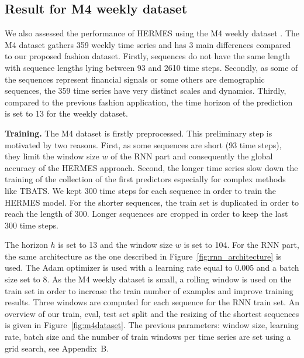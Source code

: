 \documentclass[review]{elsarticle}
\begin{document}
\subsection{Result for M4 weekly dataset}

We also assessed the performance of HERMES using the M4 weekly dataset \cite{makridakis2020m4}. The M4 dataset gathers 359 weekly time series and has 3 main differences compared to our proposed fashion dataset. Firstly, sequences do not have the same length with sequence lengths lying between 93 and 2610 time steps. Secondly, as some of the sequences represent financial signals or some others are demographic sequences, the  359 time series have very distinct scales and dynamics. Thirdly, compared to the previous fashion application, the time horizon of the prediction is set to 13 for the weekly dataset. 

\textbf{Training. } The M4 dataset is firstly preprocessed. This preliminary step is motivated by two reasons. First, as some sequences are short (93 time steps), they limit the window size $w$ of the RNN part and consequently the global accuracy of the HERMES approach. Second, the longer time series slow down the training of the collection of the first predictors especially for complex methods like TBATS. We kept 300 time steps  for each sequence in order to train the HERMES model. For the shorter sequences, the train set is duplicated in order to reach the length of 300. Longer sequences are cropped in order to keep the last 300 time steps.

The horizon $h$ is set to 13  and the window size $w$ is set to 104. For the RNN part, the same architecture as the one described in Figure~\ref{fig:rnn_architecture} is used. The Adam optimizer is used with a learning rate  equal to  0.005 and a batch size set to 8. As the M4 weekly dataset is small, a rolling window is used on the train set in order to increase the train number of examples and improve training results. Three windows are computed for each sequence for the RNN train set. An overview of our train, eval, test set split and the resizing of the shortest sequences is given in Figure~\ref{fig:m4dataset}.
The previous parameters: window size, learning rate, batch size and the number of train windows per time series are set using a grid search, see Appendix~B.
\end{document}
